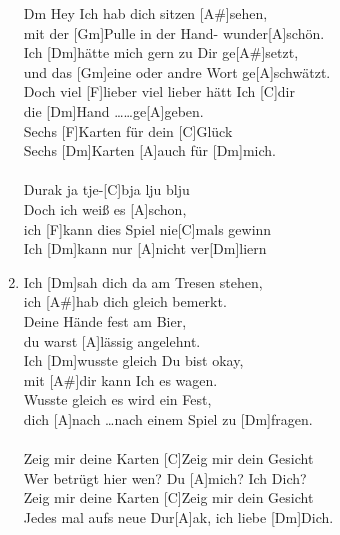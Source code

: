 \def\Titel{Durak ich liebe dich}
\def\Interpret{Die BÄND}
\def\Referenz{Ein Russisches Liebeslied}

\LiedSetup{}

\begin{guitarMagic}
    \begin{enumerate}
        \item [Dm]Hey Ich hab dich sitzen [A#]sehen, \\
            mit der [Gm]Pulle in der Hand- wunder[A]schön.\\
            Ich [Dm]hätte mich gern zu Dir ge[A#]setzt, \\
            und das  [Gm]eine oder andre Wort ge[A]schwätzt.\\
            Doch viel [F]lieber  viel lieber hätt Ich [C]dir\\
            die [Dm]Hand \ldots\ldots  ge[A]geben.\\
            Sechs [F]Karten für dein [C]Glück \\
            Sechs [Dm]Karten [A]auch für [Dm]mich. \\\ \\
            [F]Durak ja tje-[C]bja lju blju \\
            [Dm]Doch ich weiß es [A]schon, \\
            ich [F]kann dies Spiel nie[C]mals gewinn\\
            Ich [Dm]kann nur [A]nicht ver[Dm]liern\\
            \liedweiter

        \item Ich [Dm]sah dich da am Tresen stehen,\\
            ich [A#]hab dich gleich bemerkt. \\
            [Gm]Deine Hände fest am Bier, \\
            du warst [A]lässig angelehnt.\\
            Ich [Dm]wusste gleich Du bist okay, \\
            mit [A#]dir kann Ich es wagen.\\
            [Gm]Wusste gleich es wird ein Fest, \\
            dich [A]nach \ldots nach einem Spiel zu [Dm]fragen. \\\ \\
            [F]Zeig mir deine Karten [C]Zeig mir dein Gesicht\\
            [Dm]Wer betrügt hier wen?  Du [A]mich?  Ich Dich? \\
            [F]Zeig mir deine Karten [C]Zeig mir dein Gesicht\\
            [Dm]Jedes mal aufs neue Dur[A]ak, ich liebe [Dm]Dich.
    \end{enumerate}
\end{guitarMagic}
